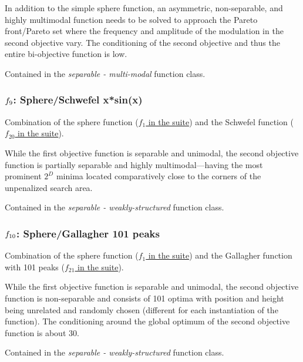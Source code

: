 \documentclass[letterpaper,12pt,english]{article}
\begin{document}
In addition to the simple sphere function, an asymmetric, non-separable,
and highly multimodal function needs to be solved to approach the Pareto
front/Pareto set where the frequency and amplitude of the modulation
in the second objective vary. The conditioning of the second objective
and thus the entire bi-objective function is low.

Contained in the \emph{separable - multi-modal} function class.


\subsubsection{\protect\(f_9\protect\): Sphere/Schwefel x*sin(x)}
\label{index:f9}\label{index:sphere-schwefel-x-sin-x}
Combination of the sphere function (\href{http://coco.lri.fr/downloads/download15.03/bbobdocfunctions.pdf\#page=5}{\(f_1\) in the  suite})
and the Schwefel function (\href{http://coco.lri.fr/downloads/download15.03/bbobdocfunctions.pdf\#page=100}{\(f_{20}\) in the  suite}).

While the first objective function is separable and unimodal,
the second objective function is partially separable and highly
multimodal---having the most prominent \(2^D\) minima located
comparatively close to the corners of the unpenalized search area.

Contained in the \emph{separable - weakly-structured} function class.


\subsubsection{\protect\(f_{10}\protect\): Sphere/Gallagher 101 peaks}
\label{index:f10}\label{index:sphere-gallagher-101-peaks}
Combination of the sphere function (\href{http://coco.lri.fr/downloads/download15.03/bbobdocfunctions.pdf\#page=5}{\(f_1\) in the  suite})
and the Gallagher function with 101 peaks (\href{http://coco.lri.fr/downloads/download15.03/bbobdocfunctions.pdf\#page=105}{\(f_{21}\) in the  suite}).

While the first objective function is separable and unimodal,
the second objective function is non-separable and consists
of 101 optima with position and height being unrelated and
randomly chosen (different for each instantiation of the function).
The conditioning around the global optimum of the second
objective function is about 30.

Contained in the \emph{separable - weakly-structured} function class.
\end{document}
